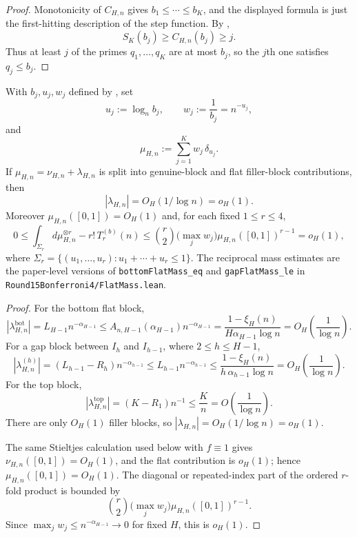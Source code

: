 \begin{proof}
Monotonicity of $C_{H,n}$ gives $b_1\le\cdots\le b_K$, and the displayed
formula is just the first-hitting description of the step function.  By
,
\[
  S_K(b_j)\ge C_{H,n}(b_j)\ge j.
\]
Thus at least $j$ of the primes $q_1,\ldots,q_K$ are at most $b_j$, so the
$j$th one satisfies $q_j\le b_j$.
\end{proof}

\begin{lemma}
\label{lem:flat-block-mass-repeated-indices}
With $b_j,u_j,w_j$ defined by , set
\[
  u_j := \log_n b_j,\qquad
  w_j := \frac{1}{b_j}=n^{-u_j},
\]
and
\[
  \mu_{H,n}:=\sum_{j=1}^K w_j\,\delta_{u_j}.
\]
If $\mu_{H,n}=\nu_{H,n}+\lambda_{H,n}$ is split into genuine-block and flat
filler-block contributions, then
\[
  |\lambda_{H,n}|=O_H(1/\log n)=o_H(1).
\]
Moreover $\mu_{H,n}([0,1])=O_H(1)$ and, for each fixed $1\le r\le4$,
\[
  0
  \le
  \int_{\Sigma_r} d\mu_{H,n}^{\otimes r}-r!\,T_r^{(b)}(n)
  \le
  \binom{r}{2}\bigl(\max_j w_j\bigr)\mu_{H,n}([0,1])^{r-1}
  =
  o_H(1),
\]
where $\Sigma_r=\{(u_1,\ldots,u_r):u_1+\cdots+u_r\le1\}$.  The reciprocal
mass estimates are the paper-level versions of
\texttt{bottomFlatMass\_eq} and \texttt{gapFlatMass\_le} in
\texttt{Round15Bonferroni4/FlatMass.lean}.
\end{lemma}

\begin{proof}
For the bottom flat block,
\[
  |\lambda_{H,n}^{\mathrm{bot}}|
  =
  L_{H-1}n^{-\alpha_{H-1}}
  \le
  A_{n,H-1}(\alpha_{H-1})n^{-\alpha_{H-1}}
  =
  \frac{1-\xi_H(n)}{H\alpha_{H-1}\log n}
  =
  O_H\!\left(\frac1{\log n}\right).
\]
For a gap block between $I_h$ and $I_{h-1}$, where $2\le h\le H-1$,
\[
  |\lambda_{H,n}^{(h)}|
  =
  (L_{h-1}-R_h)n^{-\alpha_{h-1}}
  \le
  L_{h-1}n^{-\alpha_{h-1}}
  \le
  \frac{1-\xi_H(n)}{h\,\alpha_{h-1}\log n}
  =
  O_H\!\left(\frac1{\log n}\right).
\]
For the top block,
\[
  |\lambda_{H,n}^{\mathrm{top}}|
  =
  (K-R_1)n^{-1}
  \le
  \frac{K}{n}
  =
  O\!\left(\frac1{\log n}\right).
\]
There are only $O_H(1)$ filler blocks, so
$|\lambda_{H,n}|=O_H(1/\log n)=o_H(1)$.

The same Stieltjes calculation used below with $f\equiv1$ gives
$\nu_{H,n}([0,1])=O_H(1)$, and the flat contribution is $o_H(1)$; hence
$\mu_{H,n}([0,1])=O_H(1)$.  The diagonal
or repeated-index part of the ordered $r$-fold product is bounded by
\[
  \binom{r}{2}\bigl(\max_j w_j\bigr)\mu_{H,n}([0,1])^{r-1}.
\]
Since $\max_j w_j\le n^{-\alpha_{H-1}}\to0$ for fixed $H$, this is $o_H(1)$.
\end{proof}

